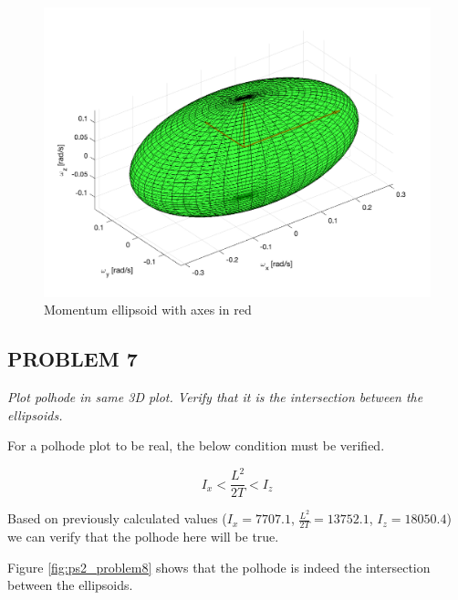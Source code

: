 \begin{figure}[H]
\centering
\includegraphics[scale=0.65]{Images/ps2_problem6_momentum.png}
\caption{Momentum ellipsoid with axes in red}
\label{fig:ps2_problem6_momentum}
\end{figure}


\subsection{PROBLEM 7}
\textit{Plot polhode in same 3D plot. Verify that it is the intersection between the ellipsoids.}

For a polhode plot to be real, the below condition must be verified.

\begin{equation*}
    I_x < \frac{L^2}{2T} < I_z
\end{equation*}

Based on previously calculated values ($I_x = 7707.1$, $\frac{L^2}{2T} = 13752.1$, $I_z = 18050.4$) we can verify that the polhode here will be true.

Figure \ref{fig:ps2_problem8} shows that the polhode is indeed the intersection between the ellipsoids.

